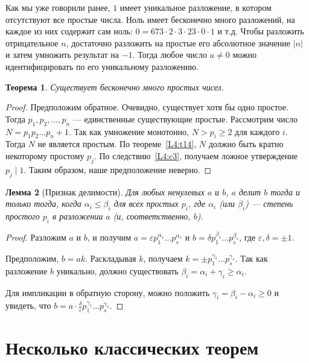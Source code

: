 \documentclass[12pt,notitlepage]{article}
\theoremstyle{plain}
\newtheorem{thm}{Теорема}[section]
\newtheorem{lemma}[thm]{Лемма}
\theoremstyle{definition}
\theoremstyle{plain}
\newcommand{\eps}{\varepsilon}
\newcommand{\1}{\mathbf{1}}
\newcommand{\0}{\mathbf{0}}
\newcommand{\dvd}{\mathop{\mid}}
\begin{document}
Как мы уже говорили ранее, $1$ имеет уникальное разложение, в котором отсутствуют все простые числа. Ноль имеет бесконечно много разложений, на каждое из них содержит сам ноль: $0 = 673 \cdot 2 \cdot 3 \cdot 23 \cdot 0 \cdot 1$ и т.д. Чтобы разложить отрицательное $n$, достаточно разложить на простые его абсолютное значение $|n|$ и затем умножить результат на $-1$. Тогда любое число $a \neq 0$ можно идентифицировать по его уникальному разложению.

\begin{thm}
	Существует бесконечно много простых чисел.
\end{thm}
\begin{proof}
	Предположим обратное. Очевидно, существует хотя бы одно простое. Тогда $p_1, p_2, \ldots, p_n$ --- единственные существующие простые. Рассмотрим число $N = p_1 p_2 \ldots p_n + 1$. Так как умножение монотонно, $N > p_i \geq 2$ для каждого $i$. Тогда $N$ не является простым. По теореме~\ref{L4:t14}, $N$ должно быть кратно некоторому простому $p_j$. По следствию~\ref{L4:c3}, получаем ложное утверждение $p_j \dvd 1$. Таким образом, наше предположение неверно.
\end{proof}



\begin{lemma}[Признак делимости]\label{L4:l16}
	Для любых ненулевых $a$ и $b$, $a$ делит $b$ тогда и только тогда, когда $\alpha_i \leq \beta_i$ для всех простых $p_i$, где $\alpha_i$ (или $\beta_i$) --- степень простого $p_i$ в разложении $a$ (и, соответственно, $b$).
\end{lemma} 
\begin{proof}
	Разложим $a$ и $b$, и получим $a = \eps p^{\alpha_1}_1\ldots p^{\alpha_s}_s$ и $b = \delta p^{\beta_1}_1\ldots p^{\beta_s}_s$, где $\eps, \delta = \pm 1$.
	
	Предположим, $b = a k$. Раскладывая $k$, получаем $k = \pm p^{\gamma_1}_1\ldots p^{\gamma_s}_s$. Так как разложение $b$ уникально, должно существовать $\beta_i = \alpha_i + \gamma_i \geq \alpha_i$.
	
	Для импликации в обратную сторону, можно положить $\gamma_i = \beta_i - \alpha_i \geq 0$ и увидеть, что $b = a \cdot \frac{\delta}{\eps}  p^{\gamma_1}_1\ldots p^{\gamma_s}_s$.
\end{proof}

\section{Несколько классических теорем}
\end{document}
